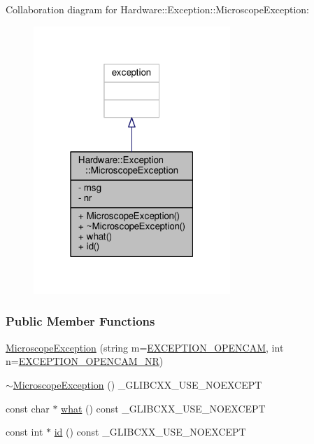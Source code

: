 Collaboration diagram for Hardware\+:\+:Exception\+:\+:Microscope\+Exception\+:
\nopagebreak
\begin{figure}[H]
\begin{center}
\leavevmode
\includegraphics[width=211pt]{class_hardware_1_1_exception_1_1_microscope_exception__coll__graph}
\end{center}
\end{figure}
\subsubsection*{Public Member Functions}
\begin{DoxyCompactItemize}
\item 
\hyperlink{class_hardware_1_1_exception_1_1_microscope_exception_a116865214db8b2698f174bfa9335fcda}{Microscope\+Exception} (string m=\hyperlink{_microscope_not_found_exception_8h_a69e1e16e9fdd8f6a1baa210cb5e10a31}{E\+X\+C\+E\+P\+T\+I\+O\+N\+\_\+\+O\+P\+E\+N\+C\+A\+M}, int n=\hyperlink{_microscope_not_found_exception_8h_af8282326d2a9ad43efdb6ad3727b5afa}{E\+X\+C\+E\+P\+T\+I\+O\+N\+\_\+\+O\+P\+E\+N\+C\+A\+M\+\_\+\+N\+R})
\item 
\hyperlink{class_hardware_1_1_exception_1_1_microscope_exception_ae6e376bd4c51b9c9e095ab4c6cc2c897}{$\sim$\+Microscope\+Exception} () \+\_\+\+G\+L\+I\+B\+C\+X\+X\+\_\+\+U\+S\+E\+\_\+\+N\+O\+E\+X\+C\+E\+P\+T
\item 
const char $\ast$ \hyperlink{class_hardware_1_1_exception_1_1_microscope_exception_aa99d37aae7639bb615ce05cf4378ae7d}{what} () const \+\_\+\+G\+L\+I\+B\+C\+X\+X\+\_\+\+U\+S\+E\+\_\+\+N\+O\+E\+X\+C\+E\+P\+T
\item 
const int $\ast$ \hyperlink{class_hardware_1_1_exception_1_1_microscope_exception_a906b2af72a1be641ee6f679771e8db9a}{id} () const \+\_\+\+G\+L\+I\+B\+C\+X\+X\+\_\+\+U\+S\+E\+\_\+\+N\+O\+E\+X\+C\+E\+P\+T
\end{DoxyCompactItemize}
